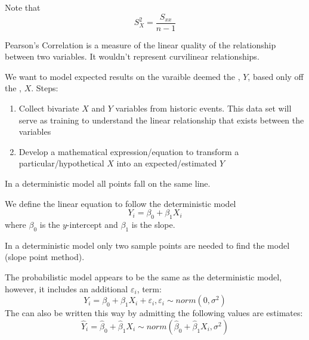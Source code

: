 \documentclass[12pt, a4paper, twoside, openright, titlepage]{book}
\begin{document}
Note that \begin{equation*}
    S_X^2 = \frac{S_{xx}}{n-1}
\end{equation*}

\begin{rmk}{}{}
    Pearson's Correlation is a measure of the linear quality of the relationship between two variables. It wouldn't represent curvilinear relationships.
\end{rmk}

\begin{rmk}{}{}
    We want to model expected results on the varaible deemed the , $Y$, based only off the , $X$. Steps: \begin{enumerate}
        \item Collect bivariate $X$ and $Y$ variables from historic events. This data set will serve as training to understand the linear relationship that exists between the variables
        \item Develop a mathematical expression/equation to transform a particular/hypothetical $X$ into an expected/estimated $Y$
    \end{enumerate}
\end{rmk}

\begin{rmk}{}{}
    In a deterministic model all points fall on the same line.
\end{rmk}


\begin{defn}{}{}
    We define the linear equation to follow the deterministic model \begin{equation*}
        Y_i = \beta_0 + \beta_1X_i
    \end{equation*}
    where $\beta_0$ is the $y$-intercept and $\beta_1$ is the slope.
\end{defn}


\begin{rmk}{}{}
    In a deterministic model only two sample points are needed to find the model (slope point method).
\end{rmk}


\begin{defn}{}{}
    The probabilistic model appears to be the same as the deterministic model, however, it includes an additional $\varepsilon_i$, term: \begin{equation*}
        Y_i = \beta_0 + \beta_1X_i + \varepsilon_i, \varepsilon_i \sim norm(0,\sigma^2)
    \end{equation*}
    The  can also be written this way by admitting the following values are estimates: \begin{equation*}
        \hat{Y}_i = \hat{\beta}_0 + \hat{\beta}_1X_i \sim norm(\hat{\beta}_0+\hat{\beta}_1X_i, \sigma^2)
    \end{equation*}
\end{defn}










 
\end{document}
